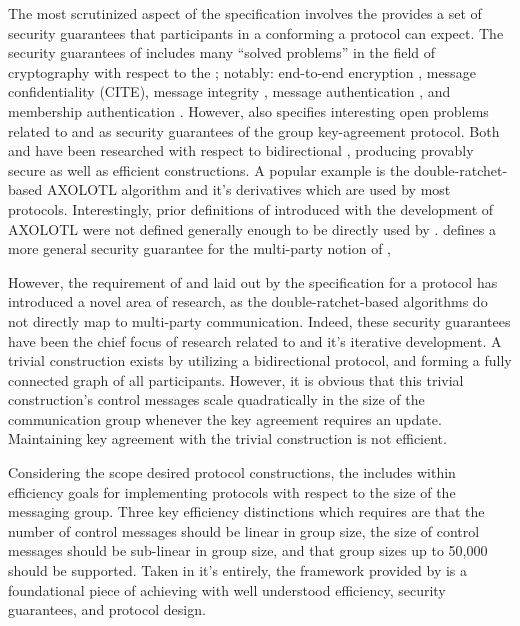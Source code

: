 The most scrutinized aspect of the  specification involves the provides a set of security guarantees that participants in a conforming a protocol can expect.
The security guarantees of  includes many ``solved problems'' in the field of cryptography with respect to the ; notably: end-to-end encryption \autocite{padlipsky1978limitations}, message confidentiality (CITE), message integrity \autocite{voydock1983security}, message authentication \autocite{jueneman1983message}, and membership authentication \autocite{chaum1985showing}.
However,  also specifies interesting open problems related to  \autocite{gunther1989identity} and  \autocite{cohn2016post} as security guarantees of the group key-agreement protocol.
Both  and  have been researched with respect to bidirectional , producing provably secure as well as efficient constructions.
A popular example is the double-ratchet-based AXOLOTL algorithm \autocite{perrin2014axolotl} and it's derivatives which are used by most  protocols.
Interestingly, prior definitions of  introduced with the development of AXOLOTL were not defined generally enough to be directly used by .
 defines a more general security guarantee for the multi-party notion of , 

However, the requirement of  and  laid out by the  specification for a  protocol has introduced a novel area of research, as the double-ratchet-based algorithms do not directly map to multi-party communication.
Indeed, these  security guarantees have been the chief focus of research related to  and it's iterative development.
A trivial construction exists by utilizing a bidirectional  protocol, and forming a fully connected graph of all  participants.
However, it is obvious that this trivial construction's control messages scale quadratically in the size of the communication group whenever the key agreement requires an update.
Maintaining key agreement with the trivial construction is not efficient.

Considering the scope desired protocol constructions, the  includes within  efficiency goals \autocite{ietf-mls-architecture-07} for implementing protocols with respect to the size of the messaging group.
Three key efficiency distinctions which  requires are that the number of control messages should be linear in group size, the size of control messages should be sub-linear in group size, and that group sizes up to 50,000 should be supported.
Taken in it's entirely, the framework provided by  is a foundational piece of achieving  with well understood efficiency, security guarantees, and protocol design.


